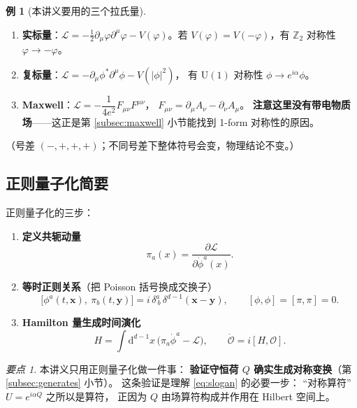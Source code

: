 \documentclass[UTF8,a4paper,11pt]{ctexart}
\theoremstyle{plain}
\theoremstyle{definition}
\newtheorem{example}{例}[section]
\theoremstyle{remark}
\newtheorem{keypoint}{要点}[section]
\newcommand{\ext}{\mathrm{d}}          %
\newcommand{\ZZ}{\mathbb{Z}}
\newcommand{\Uone}{\mathrm{U}(1)}
\newcommand{\Op}{\mathcal{O}}
\newcommand{\Lag}{\mathcal{L}}
\newcommand{\PD}[2]{\frac{\partial #1}{\partial #2}}
\begin{document}
\begin{example}[本讲义要用的三个拉氏量]
\label{ex:threelag}
\begin{enumerate}[label=(\arabic*)]
  \item \textbf{实标量}：$\Lag=-\tfrac12\partial_\mu\varphi\partial^\mu\varphi
        -V(\varphi)$。若 $V(\varphi)=V(-\varphi)$，有 $\ZZ_2$ 对称性
        $\varphi\to-\varphi$。
  \item \textbf{复标量}：$\Lag=-\partial_\mu\phi^*\partial^\mu\phi-V(|\phi|^2)$，
        有 $\Uone$ 对称性 $\phi\to e^{i\alpha}\phi$。
  \item \textbf{Maxwell}：$\Lag=-\dfrac{1}{4e^2}F_{\mu\nu}F^{\mu\nu}$，
        $F_{\mu\nu}=\partial_\mu A_\nu-\partial_\nu A_\mu$。
        \textbf{注意这里没有带电物质场}——这正是第
        \ref{subsec:maxwell} 小节能找到 1-form 对称性的原因。
\end{enumerate}
（号差 $(-,+,+,+)$；不同号差下整体符号会变，物理结论不变。）
\end{example}

\subsection{正则量子化简要}
\label{subsec:canonical}

正则量子化的三步：

\begin{enumerate}[label=\textbf{第 \arabic* 步}, leftmargin=2.1cm]
  \item \textbf{定义共轭动量}
        \begin{equation}
          \pi_a(x)=\PD{\Lag}{\dot\phi^a(x)} .
        \end{equation}
  \item \textbf{等时正则关系}（把 Poisson 括号换成交换子）
        \begin{equation}
          \big[\phi^a(t,\bm x),\ \pi_b(t,\bm y)\big]
          =i\,\delta^a_{\ b}\,\delta^{d-1}(\bm x-\bm y),
          \qquad
          [\phi,\phi]=[\pi,\pi]=0 .
          \label{eq:canonical}
        \end{equation}
  \item \textbf{Hamilton 量生成时间演化}
        \begin{equation}
          H=\int\ext^{d-1}x\,\big(\pi_a\dot\phi^a-\Lag\big),
          \qquad
          \dot{\Op}=i[H,\Op] .
        \end{equation}
\end{enumerate}

\begin{keypoint}
本讲义只用正则量子化做一件事：
\textbf{验证守恒荷 $Q$ 确实生成对称变换}（第 \ref{subsec:generates} 小节）。
这条验证是理解 \eqref{eq:slogan} 的必要一步：
“对称算符”$U=e^{i\alpha Q}$ 之所以是算符，
正因为 $Q$ 由场算符构成并作用在 Hilbert 空间上。
\end{keypoint}
\end{document}
